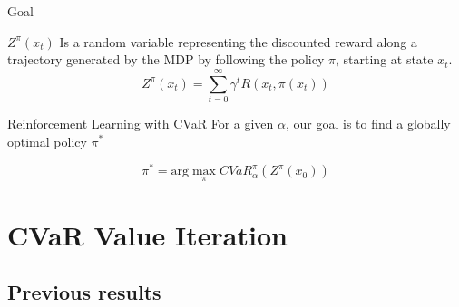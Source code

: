 \documentclass{beamer}
\begin{document}
\begin{frame}{Goal}

\begin{definition}
$Z^\pi(x_t)$ Is a random variable representing the discounted reward along a trajectory generated by the MDP by following the policy $\pi$, starting at state $x_t$.
$$Z^\pi(x_{t})=\sum_{t=0}^\infty \gamma^tR(x_t,\pi(x_t))$$

\end{definition}

\begin{block}{Reinforcement Learning with CVaR}
For a given $\alpha$, our goal is to find a globally optimal policy $\pi^*$

$$\pi^* = \text{arg}\max_\pi CVaR^\pi_\alpha(Z^\pi(x_0))$$
\end{block}
\end{frame}


\section{CVaR Value Iteration}
\subsection{Previous results}
\end{document}
